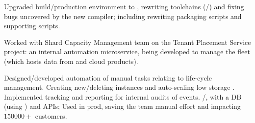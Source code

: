 \documentclass[a4paper]{resume}
\begin{document}
\begin{minipage}[t]{0.66\textwidth}
\begin{tightitemize}
		\item {
		            Upgraded build/production environment to \debian{}, rewriting toolchains (\conan{}/\cmake{}) and fixing
		            bugs uncovered by the new compiler; including rewriting packaging scripts and supporting \python scripts.
		      }
	\end{tightitemize}
	\smallsectionspace{}

	\begin{tightitemize}
		\item {
		            Worked with Shard Capacity Management team on the Tenant Placement Service project: an internal \aws{}
		            automation microservice, being developed to manage the \rds{} fleet (which hosts data from \jira{} and
		            \conf{} cloud products).
		      }
		\item {
		            Designed/developed automation of manual tasks relating to \rds{} life-cycle management. Creating
		            new/deleting \rds{} instances and auto-scaling low storage \rds{}. Implemented tracking and
		            reporting for internal audits of \rds{} events. \kotlin{}/\spring{}, with a \postgres{} DB (using
		            \jpa{}) and \rest{} APIs; Used in prod, saving the team manual effort and impacting $\num{150000} +$
		            customers.
		      }
	\end{tightitemize}
	\smallsectionspace{}

\end{minipage}
\end{document}
